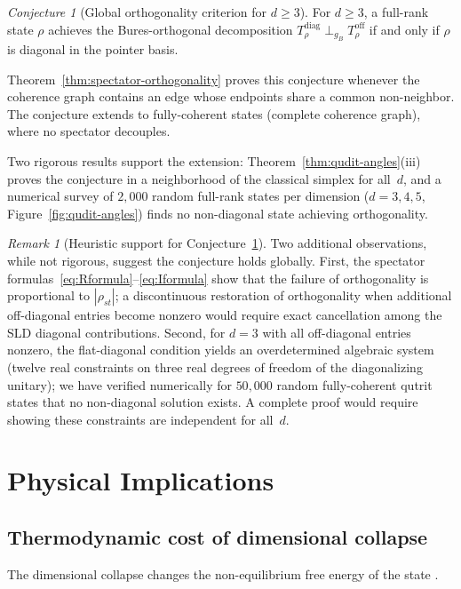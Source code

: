 \documentclass[12pt,a4paper]{article}
\theoremstyle{definition}
\theoremstyle{remark}
\newtheorem{remark}[theorem]{Remark}
\newtheorem{conjecture}[theorem]{Conjecture}
\begin{document}
\begin{conjecture}[Global orthogonality criterion for $d \geq 3$]
\label{conj:global-orthogonality}
For $d \geq 3$, a full-rank state $\rho$ achieves the Bures-orthogonal decomposition $T_\rho^{\mathrm{diag}} \perp_{g_B} T_\rho^{\mathrm{off}}$ if and only if $\rho$ is diagonal in the pointer basis.
\end{conjecture}

Theorem~\ref{thm:spectator-orthogonality} proves this conjecture whenever the coherence graph contains an edge whose endpoints share a common non-neighbor.  The conjecture extends to fully-coherent states (complete coherence graph), where no spectator decouples.

Two rigorous results support the extension: Theorem~\ref{thm:qudit-angles}(iii) proves the conjecture in a neighborhood of the classical simplex for all~$d$, and a numerical survey of $2{,}000$ random full-rank states per dimension ($d = 3, 4, 5$, Figure~\ref{fig:qudit-angles}) finds no non-diagonal state achieving orthogonality.

\begin{remark}[Heuristic support for Conjecture~\ref{conj:global-orthogonality}]
Two additional observations, while not rigorous, suggest the conjecture holds globally.  First, the spectator formulas~\eqref{eq:Rformula}--\eqref{eq:Iformula} show that the failure of orthogonality is proportional to $|\rho_{st}|$; a discontinuous restoration of orthogonality when additional off-diagonal entries become nonzero would require exact cancellation among the SLD diagonal contributions.  Second, for $d = 3$ with all off-diagonal entries nonzero, the flat-diagonal condition yields an overdetermined algebraic system (twelve real constraints on three real degrees of freedom of the diagonalizing unitary); we have verified numerically for $50{,}000$ random fully-coherent qutrit states that no non-diagonal solution exists.  A complete proof would require showing these constraints are independent for all~$d$.
\end{remark}

\section{Physical Implications}
\label{sec:implications}

\subsection{Thermodynamic cost of dimensional collapse}
\label{sec:thermodynamics}
The dimensional collapse changes the non-equilibrium free energy of the state \cite{lostaglio2015description,korzekwa2016extraction}.
\end{document}
